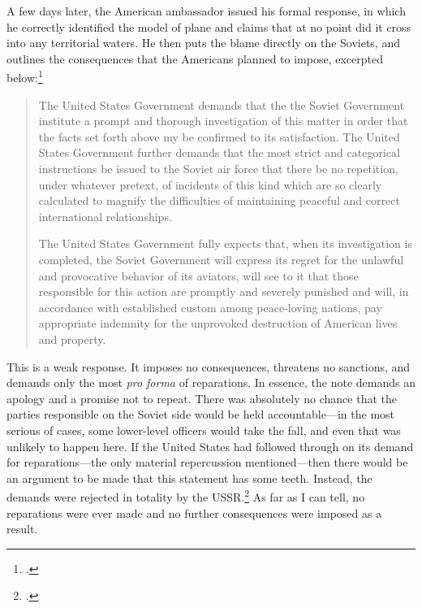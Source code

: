 \documentclass{report}
\begin{document}
\begin{refsegment}
A few days later, the American ambassador issued his formal response, in which he correctly identified the model of plane and claims that at no point did it cross into any territorial waters. He then puts the blame directly on the Soviets, and outlines the consequences that the Americans planned to impose, excerpted below:\footcite{the_associated_press_text_1950}
	\begin{quote}
	The United States Government demands that the the Soviet Government institute a prompt and thorough investigation of this matter in order that the facts set forth above my be confirmed to its satisfaction. The United States Government further demands that the most strict and categorical instructions be issued to the Soviet air force that there be no repetition, under whatever pretext, of incidents of this kind which are so clearly calculated to magnify the difficulties of maintaining peaceful and correct international relationships.

	The United States Government fully expects that, when its investigation is completed, the Soviet Government will express its regret for the unlawful and provocative behavior of its aviators, will see to it that those responsible for this action are promptly and severely punished and will, in accordance with established custom among peace-loving nations, pay appropriate indemnity for the unprovoked destruction of American lives and property.
	\end{quote}

This is a weak response. It imposes no consequences, threatens no sanctions, and demands only the most \emph{pro forma} of reparations. In essence, the note demands an apology and a promise not to repeat. There was absolutely no chance that the parties responsible on the Soviet side would be held accountable---in the most serious of cases, some lower-level officers would take the fall, and even that was unlikely to happen here. If the United States had followed through on its demand for reparations---the only material repercussion mentioned---then there would be an argument to be made that this statement has some teeth. Instead, the demands were rejected in totality by the USSR.\footcite{salisbury_kremlin_1950} As far as I can tell, no reparations were ever made and no further consequences were imposed as a result.


\end{refsegment}
\end{document}
